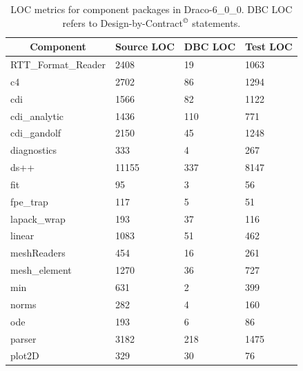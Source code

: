 \documentclass[note]{ResearchNote}
\newcommand{\draco}{Draco}
\newcommand{\dracor}{\draco-6\_0\_0}
\begin{document}
\begin{table}
  \caption{
    LOC metrics for component packages in \dracor.  DBC LOC refers to
    Design-by-Contract$^{\copyright}$ statements. 
  }
  \label{tab:loc}
  \begin{center}
    \begin{tabular}{llll}\hline\hline
      \multicolumn{1}{c}{Component} &
      \multicolumn{1}{c}{Source LOC} &
      \multicolumn{1}{c}{DBC LOC} &
      \multicolumn{1}{c}{Test LOC} \\\hline
      RTT\_Format\_Reader &     2408     &       19      &      1063     \\
      c4                 &      2702     &       86      &      1294     \\
      cdi                &      1566     &       82      &      1122     \\
      cdi\_analytic      &      1436     &      110      &       771     \\
      cdi\_gandolf       &      2150     &       45      &      1248     \\
      diagnostics        &       333     &        4      &       267     \\
      ds++               &     11155     &      337      &      8147     \\
      fit                &        95     &        3      &        56     \\
      fpe\_trap          &       117     &        5      &        51     \\
      lapack\_wrap       &       193     &       37      &       116     \\
      linear             &      1083     &       51      &       462     \\
      meshReaders        &       454     &       16      &       261     \\
      mesh\_element      &      1270     &       36      &       727     \\
      min                &       631     &        2      &       399     \\
      norms              &       282     &        4      &       160     \\
      ode                &       193     &        6      &        86     \\
      parser             &      3182     &      218      &      1475     \\
      plot2D             &       329     &       30      &        76     \\

\end{tabular}
\end{center}
\end{table}
\end{document}
